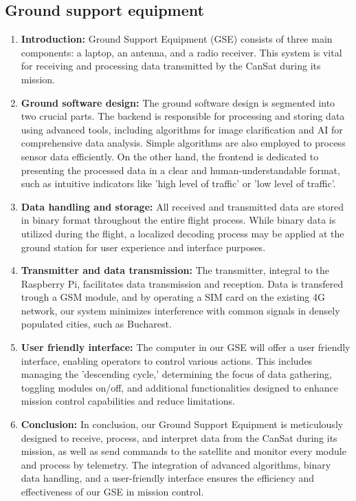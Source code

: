 \documentclass[11pt]{article}
\begin{document}
\subsection{Ground support equipment}
\begin{enumerate}
\item \textbf{Introduction:} {Ground Support Equipment (GSE) consists of three main components: a laptop, an antenna, and a radio receiver. This system is vital for receiving and processing data transmitted by the CanSat during its mission.}
\item \textbf{Ground software design:} {The ground software design is segmented into two crucial parts. The backend is responsible for processing and storing data using advanced tools, including algorithms for image clarification and AI for comprehensive data analysis. Simple algorithms are also employed to process sensor data efficiently. On the other hand, the frontend is dedicated to presenting the processed data in a clear and human-understandable format, such as intuitive indicators like 'high level of traffic' or 'low level of traffic'.}
\item \textbf{Data handling and storage:} {All received and transmitted data are stored in binary format throughout the entire flight process. While binary data is utilized during the flight, a localized decoding process may be applied at the ground station for user experience and interface purposes.}
\item \textbf{Transmitter and data transmission:} {The transmitter, integral to the Raspberry Pi, facilitates data transmission and reception. Data is transfered trough a GSM module, and by operating a SIM card on the existing 4G network, our system minimizes interference with common signals in densely populated cities, such as Bucharest.}
\item \textbf{User friendly interface:} {The computer in our GSE will offer a user friendly interface, enabling operators to control various actions. This includes managing the 'descending cycle,' determining the focus of data gathering, toggling modules on/off, and additional functionalities designed to enhance mission control capabilities and reduce limitations.}
\item \textbf{Conclusion:} {In conclusion, our Ground Support Equipment is meticulously designed to receive, process, and interpret data from the CanSat during its mission, as well as send commands to the satellite and monitor every module and process by telemetry. The integration of advanced algorithms, binary data handling, and a user-friendly interface ensures the efficiency and effectiveness of our GSE in mission control.}
\end{enumerate}
\end{document}
